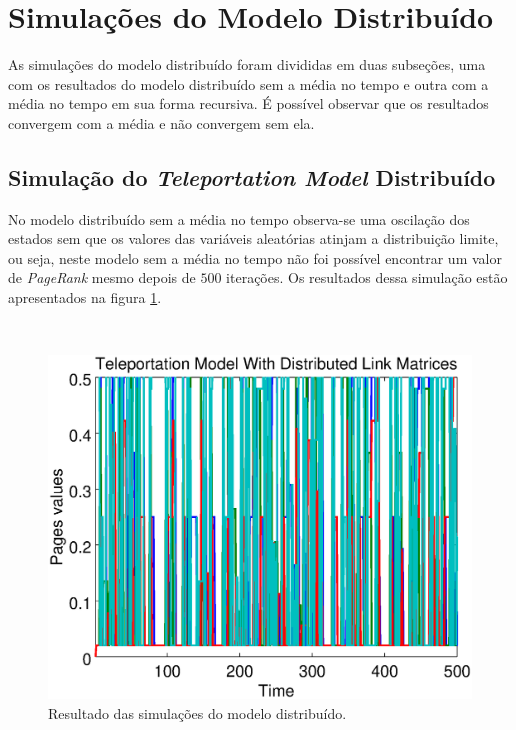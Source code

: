 \section{Simulações do Modelo Distribuído}%

As simulações do modelo distribuído foram divididas em duas subseções, uma com os resultados do modelo distribuído sem a média no tempo e outra com a média no tempo em sua forma recursiva. É possível observar que os resultados convergem com a média e não convergem sem ela.


\subsection{Simulação do \textit{Teleportation Model} Distribuído}%

No modelo distribuído sem a média no tempo observa-se uma oscilação dos estados sem que os valores das variáveis aleatórias atinjam a distribuição limite, ou seja, neste modelo sem a média no tempo não foi possível encontrar um valor de \textit{PageRank} mesmo depois de $500$ iterações. Os resultados dessa simulação estão apresentados na figura \ref{teledistributed}.

\
\begin{figure}[!htb]
	\centering
	\includegraphics[scale=0.4]{imagens/teledistributed}
	\caption{Resultado das simulações do modelo distribuído.}
	\label{teledistributed}
\end{figure}

